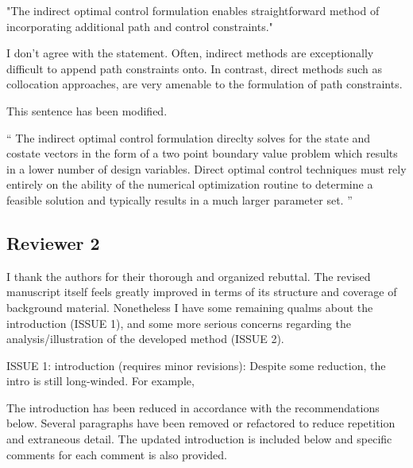 \documentclass[11pt]{article}
\newenvironment{correction}{\begin{list}{}{\setlength{\leftmargin}{1cm}\setlength{\rightmargin}{1cm}}\vspace{\parsep}\item[]``}{''\end{list}}
\begin{document}
\begin{itemize}
\begin{itshape}
"The indirect optimal control formulation enables straightforward method of incorporating additional path and control constraints."  

I don't agree with the statement. Often, indirect methods are exceptionally difficult to append path constraints onto.  In contrast, direct methods such as collocation approaches, are very amenable to the formulation of path constraints.
    \end{itshape}
    
    This sentence has been modified.
    \begin{correction}
        The indirect optimal control formulation direclty solves for the state and costate vectors in the form of a two point boundary value problem which results in a lower number of design variables.
        Direct optimal control techniques must rely entirely on the ability of the numerical optimization routine to determine a feasible solution and typically results in a much larger parameter set.
    \end{correction}
\end{itemize}
\subsection*{Reviewer 2}

\begin{itshape}
I thank the authors for their thorough and organized rebuttal.  The revised manuscript itself feels greatly improved in terms of its structure and coverage of background material.  Nonetheless I have some remaining qualms about the introduction (ISSUE 1), and some more serious concerns regarding the analysis/illustration of the developed method (ISSUE 2). 
\end{itshape}

\begin{itshape}
ISSUE 1: introduction (requires minor revisions): 
Despite some reduction, the intro is still long-winded.  For example,
\end{itshape}

The introduction has been reduced in accordance with the recommendations below.
Several paragraphs have been removed or refactored to reduce repetition and extraneous detail.
The updated introduction is included below and specific comments for each comment is also provided.
\end{document}
